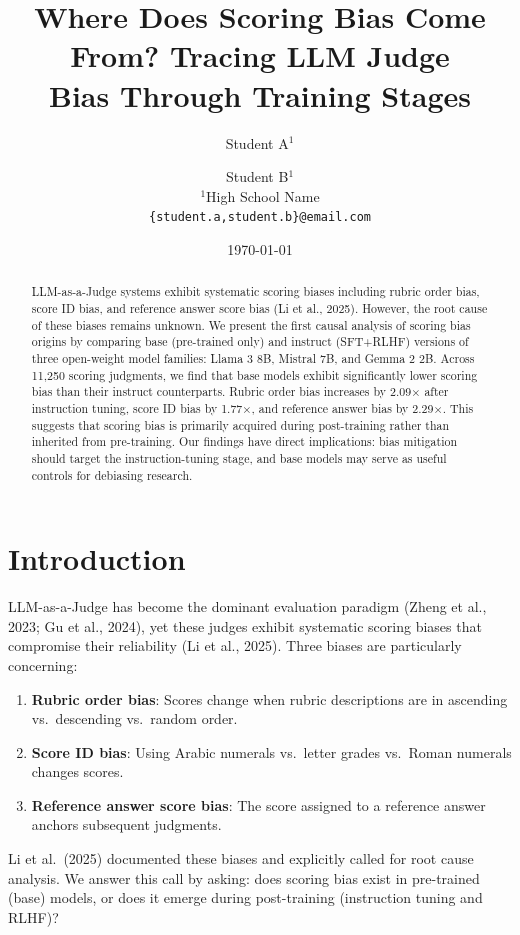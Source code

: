 \documentclass[11pt,twocolumn]{article}
\title{Where Does Scoring Bias Come From? Tracing LLM Judge\\Bias Through Training Stages}
\author{Student A$^{1}$ \and Student B$^{1}$ \\
$^{1}$High School Name \\
\texttt{\{student.a,student.b\}@email.com}
}
\date{\today}
\begin{document}
\maketitle

\begin{abstract}
LLM-as-a-Judge systems exhibit systematic scoring biases including rubric order bias, score ID bias, and reference answer score bias (Li et al., 2025). However, the root cause of these biases remains unknown. We present the first causal analysis of scoring bias origins by comparing base (pre-trained only) and instruct (SFT+RLHF) versions of three open-weight model families: Llama 3 8B, Mistral 7B, and Gemma 2 2B. Across 11,250 scoring judgments, we find that base models exhibit significantly lower scoring bias than their instruct counterparts. Rubric order bias increases by 2.09$\times$ after instruction tuning, score ID bias by 1.77$\times$, and reference answer bias by 2.29$\times$. This suggests that scoring bias is primarily acquired during post-training rather than inherited from pre-training. Our findings have direct implications: bias mitigation should target the instruction-tuning stage, and base models may serve as useful controls for debiasing research.
\end{abstract}

\section{Introduction}

LLM-as-a-Judge has become the dominant evaluation paradigm (Zheng et al., 2023; Gu et al., 2024), yet these judges exhibit systematic scoring biases that compromise their reliability (Li et al., 2025). Three biases are particularly concerning:
\begin{enumerate}
    \item \textbf{Rubric order bias}: Scores change when rubric descriptions are in ascending vs.\ descending vs.\ random order.
    \item \textbf{Score ID bias}: Using Arabic numerals vs.\ letter grades vs.\ Roman numerals changes scores.
    \item \textbf{Reference answer score bias}: The score assigned to a reference answer anchors subsequent judgments.
\end{enumerate}

Li et al.~(2025) documented these biases and explicitly called for root cause analysis. We answer this call by asking: does scoring bias exist in pre-trained (base) models, or does it emerge during post-training (instruction tuning and RLHF)?
\end{document}
